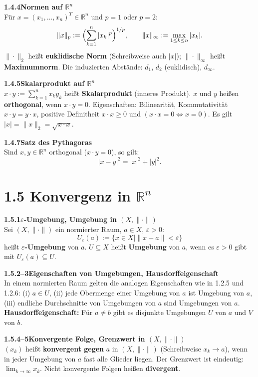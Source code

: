 \documentclass[a4paper,12pt]{article}
\newcommand{\gentry}[3]{%
  \noindent\textbf{#1\quad #2}\nopagebreak\\[0.2em]
  #3\par\smallskip
}
\begin{document}
\gentry{1.4.4}{Normen auf $\mathbb{R}^n$}{%
  Für $x = (x_1, \ldots, x_n)^T \in \mathbb{R}^n$ und $p = 1$ oder $p = 2$:
  \[
    \|x\|_p := \Bigl(\sum_{k=1}^n |x_k|^p\Bigr)^{1/p}, \qquad
    \|x\|_\infty := \max_{1 \leq k \leq n} |x_k|.
  \]
  $\|\cdot\|_2$ heißt \textbf{euklidische Norm} (Schreibweise auch $|x|$);
  $\|\cdot\|_\infty$ heißt \textbf{Maximumnorm}.
  Die induzierten Abstände: $d_1$, $d_2$ (euklidisch), $d_\infty$.
}

\gentry{1.4.5}{Skalarprodukt auf $\mathbb{R}^n$}{%
  $x \cdot y := \sum_{k=1}^n x_k y_k$ heißt \textbf{Skalarprodukt} (inneres Produkt).
  $x$ und $y$ heißen \textbf{orthogonal}, wenn $x \cdot y = 0$.
  Eigenschaften: Bilinearität, Kommutativität $x \cdot y = y \cdot x$,
  positive Definitheit $x \cdot x \geq 0$ und $(x \cdot x = 0 \Leftrightarrow x = 0)$.
  Es gilt $|x| = \|x\|_2 = \sqrt{x \cdot x}$.
}

\gentry{1.4.7}{Satz des Pythagoras}{%
  Sind $x, y \in \mathbb{R}^n$ orthogonal ($x \cdot y = 0$), so gilt:
  \[
    |x - y|^2 = |x|^2 + |y|^2.
  \]
}

\section*{1.5 \quad Konvergenz in $\mathbb{R}^n$}

\gentry{1.5.1}{$\varepsilon$-Umgebung, Umgebung in $(X, \|\cdot\|)$}{%
  Sei $(X, \|\cdot\|)$ ein normierter Raum, $a \in X$, $\varepsilon > 0$:
  \[
    U_\varepsilon(a) := \{x \in X \mid \|x - a\| < \varepsilon\}
  \]
  heißt \textbf{$\varepsilon$-Umgebung} von $a$. $U \subseteq X$ heißt \textbf{Umgebung} von $a$,
  wenn es $\varepsilon > 0$ gibt mit $U_\varepsilon(a) \subseteq U$.
}

\gentry{1.5.2--3}{Eigenschaften von Umgebungen, Hausdorffeigenschaft}{%
  In einem normierten Raum gelten die analogen Eigenschaften wie in 1.2.5 und 1.2.6:
  (i) $a \in U$,
  (ii) jede Obermenge einer Umgebung von $a$ ist Umgebung von $a$,
  (iii) endliche Durchschnitte von Umgebungen von $a$ sind Umgebungen von $a$.
  \textbf{Hausdorffeigenschaft:} Für $a \neq b$ gibt es disjunkte Umgebungen $U$ von $a$
  und $V$ von $b$.
}

\gentry{1.5.4--5}{Konvergente Folge, Grenzwert in $(X, \|\cdot\|)$}{%
  $(x_k)$ heißt \textbf{konvergent gegen} $a$ in $(X, \|\cdot\|)$ (Schreibweise $x_k \to a$),
  wenn in jeder Umgebung von $a$ fast alle Glieder liegen.
  Der Grenzwert ist eindeutig: $\lim_{k \to \infty} x_k$.
  Nicht konvergente Folgen heißen \textbf{divergent}.
}
\end{document}
